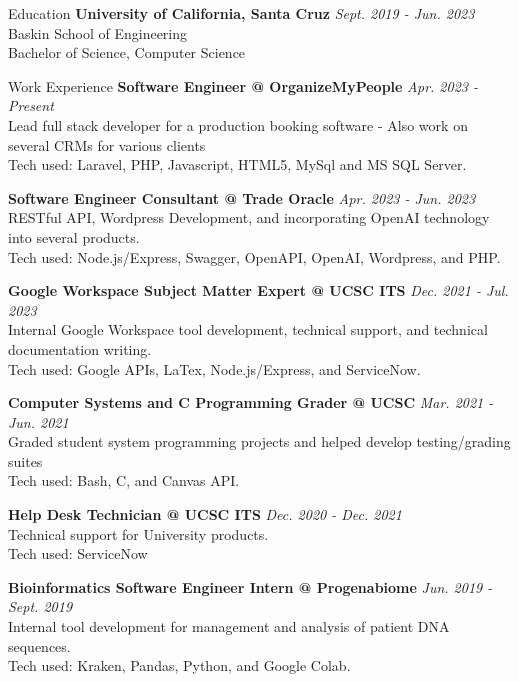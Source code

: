 \documentclass{resume} %
\begin{document}
\begin{rSection}{Education}
    {\bf{University of California, Santa Cruz}}
    \hfill{\em Sept. 2019 - Jun. 2023}
    \\ Baskin School of Engineering
    \\ Bachelor of Science, Computer Science
\end{rSection}

\begin{rSection}{Work Experience}
    {\bf{Software Engineer} @ OrganizeMyPeople}
    \hfill{\em Apr. 2023 - Present}
    \\ Lead full stack developer for a production booking software - Also work on several CRMs for various clients
    \\ Tech used: Laravel, PHP, Javascript, HTML5, MySql and MS SQL Server.

    {\bf{Software Engineer Consultant} @  Trade Oracle}
    \hfill{\em Apr. 2023 - Jun. 2023}
    \\ RESTful API, Wordpress Development, and incorporating OpenAI technology into several products.
    \\ Tech used: Node.js/Express, Swagger, OpenAPI, OpenAI, Wordpress, and PHP. 

    {\bf{Google Workspace Subject Matter Expert} @ UCSC ITS }
    \hfill{\em Dec. 2021 - Jul. 2023}
    \\ Internal Google Workspace tool development, technical support, and technical documentation writing.
    \\ Tech used: Google APIs, LaTex, Node.js/Express, and ServiceNow.


    {\bf{Computer Systems and C Programming Grader} @ UCSC}
    \hfill{\em Mar. 2021 - Jun. 2021}
    \\ Graded student system programming projects and helped develop testing/grading suites
    \\ Tech used: Bash, C, and Canvas API.

    {\bf{Help Desk Technician} @ UCSC ITS}
    \hfill{\em Dec. 2020 - Dec. 2021}
    \\ Technical support for University products.
    \\ Tech used: ServiceNow

    {\bf{Bioinformatics Software Engineer Intern} @ Progenabiome}
    \hfill{\em Jun. 2019 - Sept. 2019}
    \\ Internal tool development for management and analysis of patient DNA sequences.
    \\ Tech used: Kraken, Pandas, Python, and Google Colab.
\end{rSection}
\end{document}
